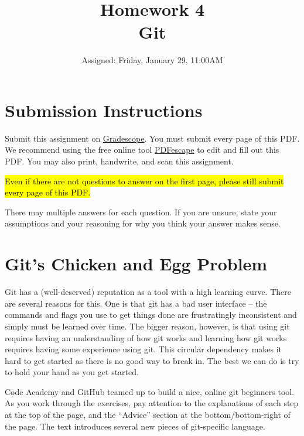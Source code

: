 \documentclass{article}
\begin{document}
\fancyfoot[C]{\color{gray} \thepage~/~\pageref*{LastPage}}
\pagestyle{fancyplain}



\title{\textbf{Homework 4\\Git}}
\author{Assigned: Friday, January 29, 11:00AM}
\date{\textbf{\color{red}{Due: Friday, February 5, 11:00AM (Hard Deadline)}}}
\maketitle


\section*{Submission Instructions}
Submit this assignment on \href{https://gradescope.com/courses/2248}{Gradescope}.
You must submit every page of this PDF.
We recommend using the free online tool \href{https://www.pdfescape.com}{PDFescape}
to edit and fill out this PDF.
You may also print, handwrite, and scan this assignment.

\medskip
\noindent
\hl{Even if there are not questions to answer on the first page, please still
submit every page of this PDF.}

\medskip
\noindent
There may multiple answers for each question. If you are unsure,
state your assumptions and your reasoning for why you think your answer
makes sense.

\section{Git's Chicken and Egg Problem}

Git has a (well-deserved) reputation as a tool with a high learning curve.
There are several reasons for this. One is that git has a bad user interface
-- the commands and flags you use to get things done are frustratingly
inconsistent and simply must be learned over time.
The bigger reason, however, is that using git requires having an understanding
of how git works and learning how git works requires having some experience
using git. This circular dependency makes it hard to get started as there is
no good way to break in. The best we can do is try to hold your hand as you
get started.

\medskip
\noindent
Code Academy and GitHub teamed up to build a nice, online git beginners tool.
As you work through the exercises, pay attention to the explanations of each
step at the top of the page, and the ``Advice'' section at the
bottom/bottom-right of the page. The text introduces several new pieces of
git-specific language.
\end{document}
